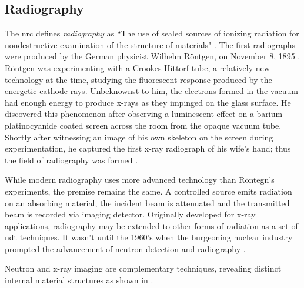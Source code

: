 \documentclass[../../../main.tex]{subfiles}
\begin{document}
%
    \subsection{Radiography}%
    \label{sec:chapter-2:radiation-detection:radiography}%
    The \gls{nrc} defines \textit{radiography} as ``The use of sealed sources of ionizing radiation for nondestructive examination of the structure of materials" \cite{website:Nuclear_Regulatory_Commission}.
    The first radiographs were produced by the German physicist Wilhelm R\"{o}ntgen, on November 8, 1895 \cite{book:Turner_1995}.
    R\"{o}ntgen was experimenting with a Crookes-Hittorf tube, a relatively new technology at the time, studying the fluorescent response produced by the energetic cathode rays.
    Unbeknownst to him, the electrons formed in the vacuum had enough energy to produce \glspl{x-ray} as they impinged on the glass surface.
    He discovered this phenomenon after observing a luminescent effect on a barium platinocyanide coated screen across the room from the opaque vacuum tube.
    Shortly after witnessing an image of his own skeleton on the screen during experimentation, he captured the first \gls{x-ray} radiograph of his wife's hand; thus the field of radiography was formed \cite{Riesz_1995}.
    \par%
    While modern radiography uses more advanced technology than R\"{o}ntegn's experiments, the premise remains the same.
    A controlled source emits radiation on an absorbing material, the incident beam is attenuated and the transmitted beam is recorded via imaging detector.
    Originally developed for \gls{x-ray} applications, radiography may be extended to other forms of radiation as a set of \gls{ndt} techniques.
    It wasn't until the 1960's when the burgeoning nuclear industry prompted the advancement of neutron detection and radiography \cite{Bollinger_1959, Firk_1961}.
    \par%
    Neutron and \gls{x-ray} imaging are complementary techniques, revealing distinct internal material structures as shown in .
\end{document}
